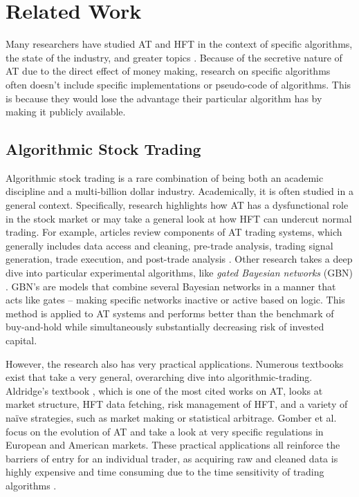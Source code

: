 \documentclass[../thesis.tex]{subfiles}
\begin{document}
\chapter{Related Work}
\label{ch:relatedwork}

Many researchers have studied AT and HFT in the context of specific algorithms, the state of the industry, and greater topics \cite{Treleaven2013}. Because of the secretive nature of AT due to the direct effect of money making, research on specific algorithms often doesn't include specific implementations or pseudo-code of algorithms. This is because they would lose the advantage their particular algorithm has by making it publicly available. 

\section{Algorithmic Stock Trading}

Algorithmic stock trading is a rare combination of being both an academic discipline and a multi-billion dollar industry. Academically, it is often studied in a general context. Specifically, research highlights how AT has a dysfunctional role in the stock market or may take a general look at how HFT can undercut normal trading.  For example, articles review components of AT trading systems, which generally includes data access and cleaning, pre-trade analysis, trading signal generation, trade execution, and post-trade analysis \cite{Treleaven2013}. Other research takes a deep dive into particular experimental algorithms, like \textit{gated Bayesian networks} (GBN) \cite{Bendtsen2016}. GBN's are models that combine several Bayesian networks in a manner that acts like gates -- making specific networks inactive or active based on logic. This method is applied to AT systems and performs better than the benchmark of buy-and-hold while simultaneously substantially decreasing risk of invested capital. 

However, the research also has very practical applications. Numerous textbooks exist that take a very general, overarching dive into algorithmic-trading. Aldridge's textbook \cite{Aldridge2010}, which is one of the most cited works on AT, looks at market structure, HFT data fetching, risk management of HFT, and a variety of na\"{i}ve strategies, such as market making or statistical arbitrage. Gomber et al. \cite{Gomber2011} focus on the evolution of AT and take a look at very specific regulations in European and American markets. These practical applications all reinforce the barriers of entry for an individual trader, as acquiring raw and cleaned data is highly expensive and time consuming due to the time sensitivity of trading algorithms \cite{Treleaven2013}. 
\end{document}

